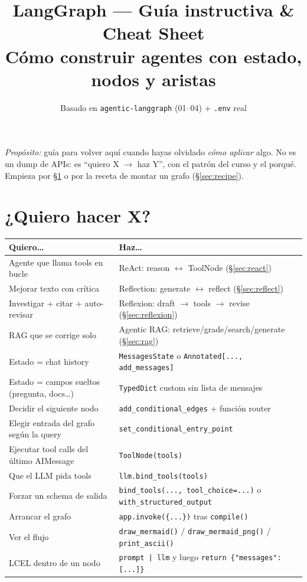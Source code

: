 \documentclass[11pt,a4paper]{article}
\title{%
  \textbf{LangGraph --- Guía instructiva \& Cheat Sheet}\\[0.35em]
  \large Cómo construir agentes con estado, nodos y aristas
}
\author{Basado en \texttt{agentic-langgraph} (01--04) + \texttt{.env} real}
\date{}
\begin{document}
\maketitle
\tableofcontents
\vspace{0.6em}

\noindent\textit{Propósito:} guía para volver aquí cuando hayas olvidado \emph{cómo aplicar} algo.
No es un dump de APIs: es ``quiero X $\to$ haz Y'', con el patrón del curso y el porqué.
Empieza por \S\ref{sec:decision} o por la receta de montar un grafo (\S\ref{sec:recipe}).

\section{¿Quiero hacer X?}
\label{sec:decision}

\begin{center}
\begin{tabular}{@{}p{6.6cm}p{8.7cm}@{}}
\toprule
\textbf{Quiero\ldots} & \textbf{Haz\ldots} \\
\midrule
Agente que llama tools en bucle & ReAct: reason $\leftrightarrow$ ToolNode (\S\ref{sec:react}) \\
Mejorar texto con crítica & Reflection: generate $\leftrightarrow$ reflect (\S\ref{sec:reflect}) \\
Investigar + citar + auto-revisar & Reflexion: draft $\to$ tools $\to$ revise (\S\ref{sec:reflexion}) \\
RAG que se corrige solo & Agentic RAG: retrieve/grade/search/generate (\S\ref{sec:rag}) \\
Estado = chat history & \texttt{MessagesState} o \texttt{Annotated[..., add\_messages]} \\
Estado = campos sueltos (pregunta, docs\ldots) & \texttt{TypedDict} custom sin lista de mensajes \\
Decidir el siguiente nodo & \texttt{add\_conditional\_edges} + función router \\
Elegir entrada del grafo según la query & \texttt{set\_conditional\_entry\_point} \\
Ejecutar tool calls del último AIMessage & \texttt{ToolNode(tools)} \\
Que el LLM pida tools & \texttt{llm.bind\_tools(tools)} \\
Forzar un schema de salida & \texttt{bind\_tools(..., tool\_choice=...)} o \texttt{with\_structured\_output} \\
Arrancar el grafo & \texttt{app.invoke(\{...\})} tras \texttt{compile()} \\
Ver el flujo & \texttt{draw\_mermaid()} / \texttt{draw\_mermaid\_png()} / \texttt{print\_ascii()} \\
LCEL dentro de un nodo & \texttt{prompt | llm} y luego \texttt{return \{"messages": [...]\} } \\
\bottomrule
\end{tabular}
\end{center}
\end{document}
